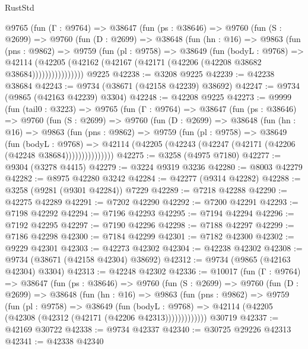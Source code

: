\begin{lexlean}{RustStd}
\begin{coremodule}
      @9765
        (fun (Γ : @9764) =>
        @38647
          (fun (ps : @38646) =>
          @9760
            (fun (S : @2699) =>
            @9760
              (fun (D : @2699) =>
              @38648
                (fun (hn : @16) =>
                @9863
                  (fun (pns : @9862) =>
                  @9759
                    (fun (pl : @9758) =>
                    @38649
                      (fun (bodyL : @9768) =>
                      @42114
                        (@42205
                          (@42162 (@42167 (@42171 (@42206 (@42208 @38682 @38684))))))))))))))))
    @9225
@42238 := @3208 @9225
@42239 := @42238 @38684
@42243 := @9734 (@38671 (@42158 @42239) @38692)
@42247 := @9734 (@9865 (@42163 @42239) @3304)
@42248 := @42208 @9225
@42273 := @9999
    (fun (tail0 : @3223) =>
    @9765
      (fun (Γ : @9764) =>
      @38647
        (fun (ps : @38646) =>
        @9760
          (fun (S : @2699) =>
          @9760
            (fun (D : @2699) =>
            @38648
              (fun (hn : @16) =>
              @9863
                (fun (pns : @9862) =>
                @9759
                  (fun (pl : @9758) =>
                  @38649
                    (fun (bodyL : @9768) =>
                    @42114 (@42205 (@42243 (@42247 (@42171 (@42206 (@42248 @38684)))))))))))))))
@42275 := @3258 (@4975 @7180)
@42277 := @9304 (@3278 @4415)
@42279 := @3224 @9319 @3236
@42280 := @8003 @42279
@42282 := @8975 @42280 @3242
@42284 := @42277 (@9314 @42282)
@42288 := @3258 (@9281 (@9301 @42284)) @7229
@42289 := @7218 @42288
@42290 := @42275 @42289
@42291 := @7202 @42290
@42292 := @7200 @42291
@42293 := @7198 @42292
@42294 := @7196 @42293
@42295 := @7194 @42294
@42296 := @7192 @42295
@42297 := @7190 @42296
@42298 := @7188 @42297
@42299 := @7186 @42298
@42300 := @7184 @42299
@42301 := @7182 @42300
@42302 := @9229 @42301
@42303 := @42273 @42302
@42304 := @42238 @42302
@42308 := @9734 (@38671 (@42158 @42304) @38692)
@42312 := @9734 (@9865 (@42163 @42304) @3304)
@42313 := @42248 @42302
@42336 := @10017
    (fun (Γ : @9764) =>
    @38647
      (fun (ps : @38646) =>
      @9760
        (fun (S : @2699) =>
        @9760
          (fun (D : @2699) =>
          @38648
            (fun (hn : @16) =>
            @9863
              (fun (pns : @9862) =>
              @9759
                (fun (pl : @9758) =>
                @38649
                  (fun (bodyL : @9768) =>
                  @42114 (@42205 (@42308 (@42312 (@42171 (@42206 @42313)))))))))))))
    @30719
@42337 := @42169 @30722
@42338 := @9734 @42337
@42340 := @30725 @29226 @42313
@42341 := @42338 @42340

\end{coremodule}
\end{lexlean}
